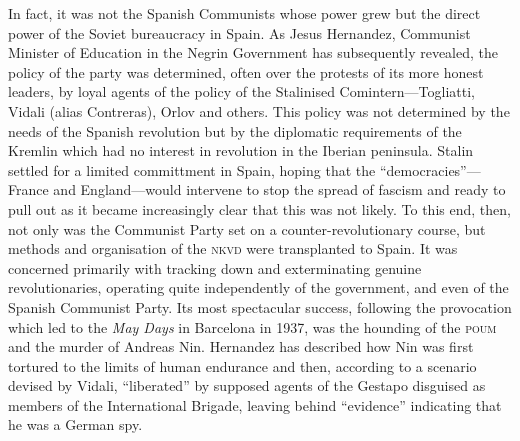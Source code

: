 In fact, it was not the Spanish Communists whose power grew but the direct power of the Soviet bureaucracy in Spain. As Jesus Hernandez, Communist Minister of Education in the Negrin Government has subsequently revealed, the policy of the party was determined, often over the protests of its more honest leaders, by loyal agents of the policy of the Stalinised Comintern---Togliatti, Vidali (alias Contreras), Orlov and others. This policy was not determined by the needs of the Spanish revolution but by the diplomatic requirements of the Kremlin which had no interest in revolution in the Iberian peninsula. Stalin settled for a limited committment in Spain, hoping that the ``democracies''---France and England---would intervene to stop the spread of fascism and ready to pull out as it became increasingly clear that this was not likely. To this end, then, not only was the Communist Party set on a counter-revolutionary course, but methods and organisation of the \textsc{nkvd} were transplanted to Spain. It was concerned primarily with tracking down and exterminating genuine revolutionaries, operating quite independently of the government, and even of the Spanish Communist Party. Its most spectacular success, following the provocation which led to the \emph{May Days} in Barcelona in 1937, was the hounding of the \textsc{poum} and the murder of Andreas Nin. Hernandez has described how Nin was first tortured to the limits of human endurance and then, according to a scenario devised by Vidali, ``liberated'' by supposed agents of the Gestapo disguised as members of the International Brigade, leaving behind ``evidence'' indicating that he was a German spy.

